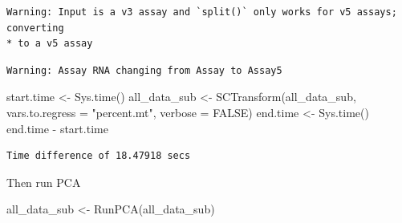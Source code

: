 \documentclass[
  letterpaper,
  DIV=11,
  numbers=noendperiod]{scrreprt}
\newenvironment{Shaded}{\begin{snugshade}}{\end{snugshade}}
\newcommand{\AttributeTok}[1]{\textcolor[rgb]{0.40,0.45,0.13}{#1}}
\newcommand{\ConstantTok}[1]{\textcolor[rgb]{0.56,0.35,0.01}{#1}}
\newcommand{\FunctionTok}[1]{\textcolor[rgb]{0.28,0.35,0.67}{#1}}
\newcommand{\NormalTok}[1]{\textcolor[rgb]{0.00,0.23,0.31}{#1}}
\newcommand{\OtherTok}[1]{\textcolor[rgb]{0.00,0.23,0.31}{#1}}
\newcommand{\SpecialCharTok}[1]{\textcolor[rgb]{0.37,0.37,0.37}{#1}}
\newcommand{\StringTok}[1]{\textcolor[rgb]{0.13,0.47,0.30}{#1}}
\begin{document}
\begin{Shaded}
\end{Shaded}

\begin{verbatim}
Warning: Input is a v3 assay and `split()` only works for v5 assays; converting
* to a v5 assay
\end{verbatim}

\begin{verbatim}
Warning: Assay RNA changing from Assay to Assay5
\end{verbatim}

\begin{Shaded}
\begin{Highlighting}[]
\NormalTok{start.time }\OtherTok{\textless{}{-}} \FunctionTok{Sys.time}\NormalTok{()}
\NormalTok{all\_data\_sub }\OtherTok{\textless{}{-}} \FunctionTok{SCTransform}\NormalTok{(all\_data\_sub, }\AttributeTok{vars.to.regress =} \StringTok{"percent.mt"}\NormalTok{, }\AttributeTok{verbose =} \ConstantTok{FALSE}\NormalTok{)}
\NormalTok{end.time }\OtherTok{\textless{}{-}} \FunctionTok{Sys.time}\NormalTok{()}
\NormalTok{end.time }\SpecialCharTok{{-}}\NormalTok{ start.time}
\end{Highlighting}
\end{Shaded}

\begin{verbatim}
Time difference of 18.47918 secs
\end{verbatim}

Then run PCA

\begin{Shaded}
\begin{Highlighting}[]
\NormalTok{all\_data\_sub }\OtherTok{\textless{}{-}} \FunctionTok{RunPCA}\NormalTok{(all\_data\_sub)}
\end{Highlighting}
\end{Shaded}
\end{document}
